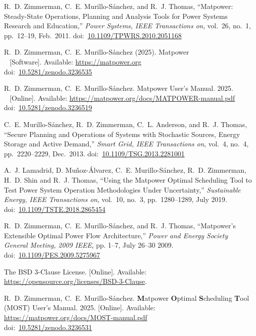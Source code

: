 \documentclass[12pt]{article}
\newcommand{\matpower}[0]{{\sc Matpower}}
\newcommand{\most}[0]{{MOST}}
\newcommand{\mostname}[0]{{{\bf M}{\sc atpower} \textbf{O}ptimal \textbf{S}cheduling \textbf{T}ool}}
\newcommand{\doi}[1]{doi:~\href{https://doi.org/#1}{#1}}
\numberwithin{equation}{section}
\numberwithin{table}{section}
\numberwithin{figure}{section}
\begin{document}
\clearpage
\begin{thebibliography}{99}
R.~D. Zimmerman, C.~E. Murillo-S{\'a}nchez, and R.~J. Thomas,
  ``\matpower{}: Steady-State Operations, Planning and Analysis Tools for Power Systems Research and Education,'' \emph{Power Systems, IEEE Transactions on}, vol.~26, no.~1, pp.~12--19, Feb.~2011.
\doi{10.1109/TPWRS.2010.2051168}

R.~D. Zimmerman, C.~E. Murillo-S{\'a}nchez (2025). \matpower{}\\~
[Software]. Available: \url{https://matpower.org}\\
\doi{10.5281/zenodo.3236535}

R.~D. Zimmerman, C.~E. Murillo-S{\'a}nchez. \matpower{} User's Manual. 2025.\\~
[Online]. Available: \url{https://matpower.org/docs/MATPOWER-manual.pdf}\\
\doi{10.5281/zenodo.3236519}

C.~E. Murillo-S{\'a}nchez, R.~D. Zimmerman, C.~L. Anderson, and R.~J. Thomas, ``Secure Planning and Operations of Systems with Stochastic Sources, Energy Storage and Active Demand,'' \emph{Smart Grid, IEEE Transactions on}, vol.~4, no.~4, pp.~2220--2229, Dec.~2013.
\doi{10.1109/TSG.2013.2281001}

A.~J. Lamadrid, D. Mu{\~n}oz-{\'A}lvarez, C.~E. Murillo-S{\'a}nchez, R.~D. Zimmerman, H.~D. Shin and R.~J. Thomas, ``Using the \matpower{} Optimal Scheduling Tool to Test Power System Operation Methodologies Under Uncertainty,'' \emph{Sustainable Energy, IEEE Transactions on}, vol.~10, no.~3, pp.~1280--1289, July 2019.
\doi{10.1109/TSTE.2018.2865454}

R.~D. Zimmerman, C.~E. Murillo-S{\'a}nchez, and R.~J. Thomas, ``\matpower{}'s
Extensible Optimal Power Flow Architecture,'' \emph{Power and Energy Society
General Meeting, 2009 IEEE}, pp. 1--7, July 26--30 2009.
\doi{10.1109/PES.2009.5275967}

The BSD 3-Clause License. [Online]. Available: \url{https://opensource.org/licenses/BSD-3-Clause}.

R.~D. Zimmerman, C.~E. Murillo-S{\'a}nchez. \mostname{} (\most{}) User's Manual. 2025. [Online]. Available: \url{https://matpower.org/docs/MOST-manual.pdf}\\
\doi{10.5281/zenodo.3236531}


\end{thebibliography}
\end{document}
